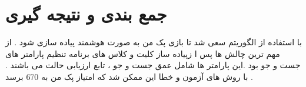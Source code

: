 \chapter{جمع بندی و نتیجه گیری}
با استفاده از الگوریتم   سعی شد تا بازی پک من  به صورت هوشمند پیاده سازی شود . از مهم ترین چالش ها پس ا زپیاده ساز کلیت و کلاس های برنامه تنظیم پارامتر های جست و جو بود .این پارامتر ها شامل عمق جست و جو ، تابع ارزیابی حالت می باشند . با روش های آزمون و خطا این ممکن شد که امتیاز پک من به 670 برسد .